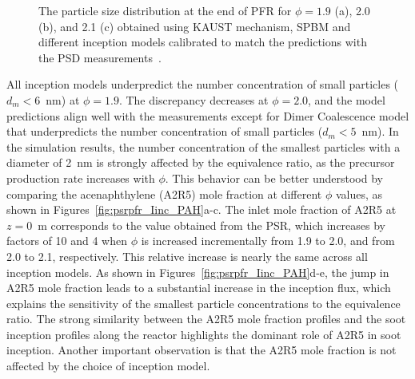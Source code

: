 \begin{figure}[H]
	\centering
	\caption{The particle size distribution at the end of PFR for $\phi=1.9$ (a), 2.0 (b), and 2.1 (c) obtained using KAUST mechanism, SPBM and different inception models calibrated to match the predictions with the PSD measurements~\citep{manzello2007soot}.}
	\label{fig:psrpfr_psd} 
\end{figure}

All inception models underpredict the number concentration of small particles ($d_m < 6$~nm) at $\phi = 1.9$. The discrepancy decreases at $\phi = 2.0$, and the model predictions align well with the measurements except for Dimer Coalescence model that underpredicts the number concentration of small particles ($d_m<5$~nm). In the simulation results, the number concentration of the smallest particles with a diameter of 2~nm is strongly affected by the equivalence ratio, as the precursor production rate increases with $\phi$. This behavior can be better understood by comparing the acenaphthylene (A2R5) mole fraction at different $\phi$ values, as shown in Figures~\ref{fig:psrpfr_Iinc_PAH}a-c. The inlet mole fraction of A2R5 at $z = 0$~m corresponds to the value obtained from the PSR, which increases by factors of 10 and 4 when $\phi$ is increased incrementally from 1.9 to 2.0, and from 2.0 to 2.1, respectively. This relative increase is nearly the same across all inception models. As shown in Figures~\ref{fig:psrpfr_Iinc_PAH}d-e, the jump in A2R5 mole fraction leads to a substantial increase in the inception flux, which explains the sensitivity of the smallest particle concentrations to the equivalence ratio. The strong similarity between the A2R5 mole fraction profiles and the soot inception profiles along the reactor highlights the dominant role of A2R5 in soot inception. Another important observation is that the A2R5 mole fraction is not affected by the choice of inception model.


